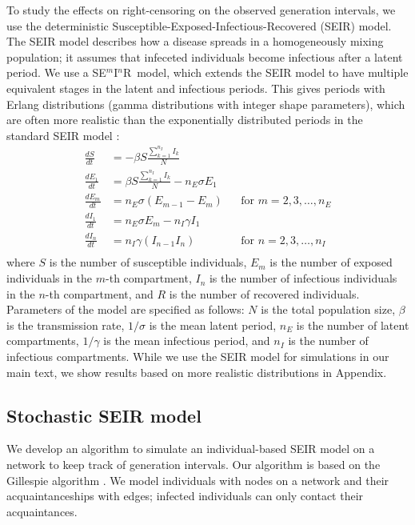 \documentclass[12pt]{article}
\newcommand{\seminar}{SE\mbox{$^m$}I\mbox{$^n$}R}
\begin{document}
To study the effects on right-censoring on the observed generation intervals, we use the deterministic Susceptible-Exposed-Infectious-Recovered (SEIR) model.
The SEIR model describes how a disease spreads in a homogeneously mixing population; it assumes that infeceted individuals become infectious after a latent period.
We use a \seminar\ model, which extends the SEIR model to have multiple equivalent stages in the latent and infectious periods. This gives periods with Erlang distributions (gamma distributions with integer shape parameters), which are often more realistic than the exponentially distributed periods in the standard SEIR model \citep{anderson1980spread, bailey1964some}: 
\begin{equation}
\begin{aligned}
\frac{dS}{dt} &= - \beta S \frac{\sum_{k=1}^{n_I} I_k}{N}\\
\frac{dE_1}{dt} &= \beta S \frac{\sum_{k=1}^{n_I} I_k}{N} - n_E \sigma E_1\\
\frac{dE_m}{dt} &= n_E \sigma (E_{m-1} - E_m) && \text{for } m = 2, 3, \dots, n_E\\
\frac{dI_1}{dt} &= n_E \sigma E_m - n_I \gamma I_1\\
\frac{dI_n}{dt} &= n_I \gamma (I_{n-1} I_n) && \text{for } n = 2, 3, \dots, n_I\\
\end{aligned}
\end{equation}
where $S$ is the number of susceptible individuals, $E_m$ is the number of exposed individuals in the $m$-th compartment, $I_n$ is the number of infectious individuals in the $n$-th compartment, and $R$ is the number of recovered individuals.
Parameters of the model are specified as follows: $N$ is the total population size, $\beta$ is the transmission rate, $1/\sigma$ is the mean latent period, $n_E$ is the number of latent compartments, $1/\gamma$ is the mean infectious period, and $n_I$ is the number of infectious compartments.
While we use the SEIR model for simulations in our main text, we show results based on more realistic distributions in Appendix.

\subsection{Stochastic SEIR model}

We develop an algorithm to simulate an individual-based SEIR model on a network to keep track of generation intervals.
Our algorithm is based on the Gillespie algorithm \citep{gillespie1977exact}.
We model individuals with nodes on a network and their acquaintanceships with edges; infected individuals can only contact their acquaintances.
\end{document}
